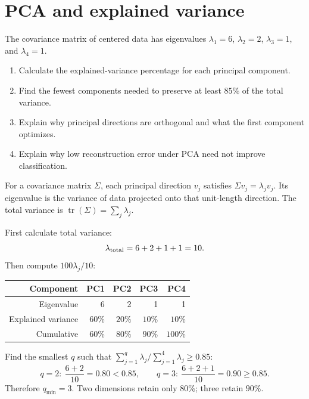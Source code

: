\section{PCA and explained variance}
\label{sec:ex8}
\begin{problem}
The covariance matrix of centered data has eigenvalues $\lambda_1=6$, $\lambda_2=2$, $\lambda_3=1$, and $\lambda_4=1$.
\begin{enumerate}[label=\textbf{(\alph*)}]
\item Calculate the explained-variance percentage for each principal component.
\item Find the fewest components needed to preserve at least $85\%$ of the total variance.
\item Explain why principal directions are orthogonal and what the first component optimizes.
\item Explain why low reconstruction error under PCA need not improve classification.
\end{enumerate}
\end{problem}


\begin{concept}
For a covariance matrix $\Sigma$, each principal direction $v_j$ satisfies $\Sigma v_j=\lambda_j v_j$. Its eigenvalue is the variance of data projected onto that unit-length direction. The total variance is $\operatorname{tr}(\Sigma)=\sum_j\lambda_j$.
\end{concept}

First calculate total variance:
\[
\lambda_{\rm total}=6+2+1+1=10.
\]
Then compute $100\lambda_j/10$:
\begin{center}\begin{tabular}{@{}rrrrr@{}}\toprule Component&PC1&PC2&PC3&PC4\\\midrule Eigenvalue&6&2&1&1\\ Explained variance&$60\%$&$20\%$&$10\%$&$10\%$\\ Cumulative&$60\%$&$80\%$&$90\%$&$100\%$\\\bottomrule\end{tabular}\end{center}

Find the smallest $q$ such that $\sum_{j=1}^{q}\lambda_j/\sum_{j=1}^{4}\lambda_j\geq0.85$:
\[
q=2:\ \frac{6+2}{10}=0.80<0.85,
\qquad q=3:\ \frac{6+2+1}{10}=0.90\geq0.85.
\]
Therefore $\boxed{q_{\min}=3}$. Two dimensions retain only $80\%$; three retain $90\%$.

